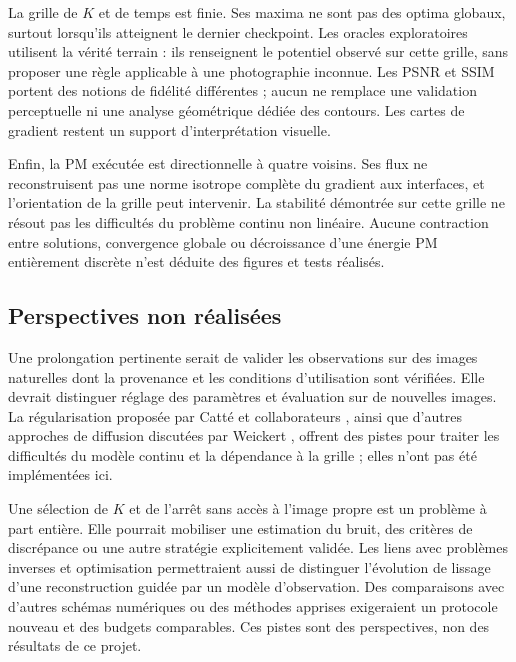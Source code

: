 La grille de $K$ et de temps est finie. Ses maxima ne sont pas des
optima globaux, surtout lorsqu'ils atteignent le dernier checkpoint.
Les oracles exploratoires utilisent la vérité terrain : ils renseignent
le potentiel observé sur cette grille, sans proposer une règle applicable
à une photographie inconnue. Les PSNR et SSIM portent des notions de
fidélité différentes ; aucun ne remplace une validation perceptuelle ni
une analyse géométrique dédiée des contours. Les cartes de gradient
restent un support d'interprétation visuelle.

Enfin, la PM exécutée est directionnelle à quatre voisins. Ses flux ne
reconstruisent pas une norme isotrope complète du gradient aux interfaces,
et l'orientation de la grille peut intervenir. La stabilité démontrée
sur cette grille ne résout pas les difficultés du problème continu
non linéaire. Aucune contraction entre solutions, convergence globale
ou décroissance d'une énergie PM entièrement discrète n'est déduite des
figures et tests réalisés.

\subsection{Perspectives non réalisées}

Une prolongation pertinente serait de valider les observations sur des
images naturelles dont la provenance et les conditions d'utilisation
sont vérifiées. Elle devrait distinguer réglage des paramètres et
évaluation sur de nouvelles images. La régularisation proposée par
Catté et collaborateurs \cite{catte1992}, ainsi que d'autres approches
de diffusion discutées par Weickert \cite{weickert1998}, offrent des
pistes pour traiter les difficultés du modèle continu et la dépendance
à la grille ; elles n'ont pas été implémentées ici.

Une sélection de $K$ et de l'arrêt sans accès à l'image propre est un
problème à part entière. Elle pourrait mobiliser une estimation du bruit,
des critères de discrépance ou une autre stratégie explicitement validée.
Les liens avec problèmes inverses et optimisation permettraient aussi
de distinguer l'évolution de lissage d'une reconstruction guidée par un
modèle d'observation. Des comparaisons avec d'autres schémas numériques
ou des méthodes apprises exigeraient un protocole nouveau et des budgets
comparables. Ces pistes sont des perspectives, non des résultats de ce
projet.
